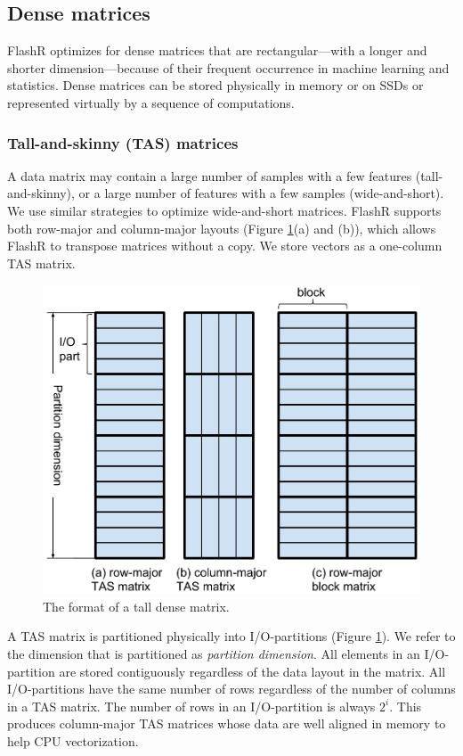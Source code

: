 \subsection{Dense matrices}
FlashR optimizes for dense matrices that are rectangular---with
a longer and shorter dimension---because of their frequent occurrence
in machine learning and statistics. Dense matrices can be stored
physically in memory or on SSDs or represented virtually by a sequence of
computations.

\subsubsection{Tall-and-skinny (TAS) matrices}
A data matrix may contain a large number of samples with a few features
(tall-and-skinny),
or a large number of features with a few samples (wide-and-short).
We use similar strategies to optimize wide-and-short matrices. FlashR
supports both row-major and column-major layouts (Figure \ref{fig:den_mat}(a)
and (b)), which allows FlashR to transpose matrices without a copy.
We store vectors as a one-column TAS matrix.

\begin{figure}
	\centering
	\includegraphics[scale=0.4]{FlashMatrix_figs/dense_matrix2.pdf}
	\caption{The format of a tall dense matrix.}
	\label{fig:den_mat}
  \vspace{-12pt}
\end{figure}

A TAS matrix is partitioned physically into I/O-partitions (Figure
\ref{fig:den_mat}). We refer to the dimension that is partitioned as
\textit{partition dimension}. All elements in an I/O-partition are stored
contiguously regardless of the data layout in the matrix. All 
I/O-partitions have the same number of rows regardless of
the number of columns in a TAS matrix. The number of rows in
an I/O-partition is always $2^i$. This produces column-major TAS
matrices whose data are well aligned in memory to help CPU vectorization.

